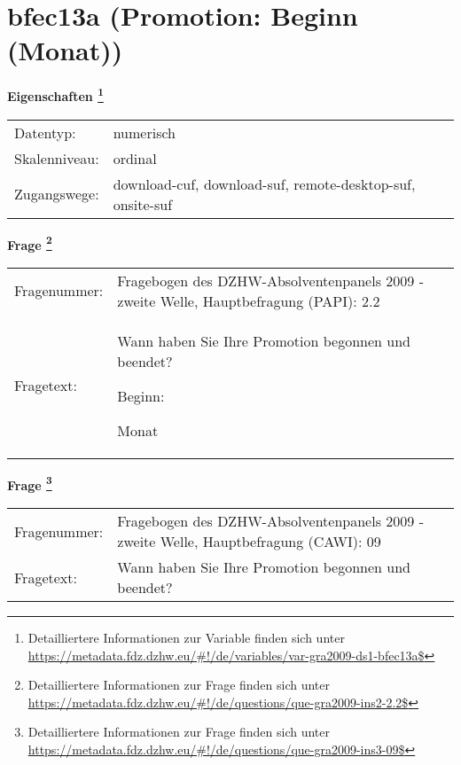 
    \setcounter{footnote}{0}

    \vspace*{-1.8cm}
	\section{bfec13a (Promotion: Beginn (Monat))}
	\label{section:bfec13a}



    \vspace*{0.5cm}
    \noindent\textbf{Eigenschaften
	\footnote{Detailliertere Informationen zur Variable finden sich unter
		\url{https://metadata.fdz.dzhw.eu/\#!/de/variables/var-gra2009-ds1-bfec13a$}}}\\
	\begin{tabularx}{\hsize}{@{}lX}
	Datentyp: & numerisch \\
	Skalenniveau: & ordinal \\
	Zugangswege: &
	  download-cuf, 
	  download-suf, 
	  remote-desktop-suf, 
	  onsite-suf
 \\
    \end{tabularx}



				\vspace*{0.5cm}
                \noindent\textbf{Frage
	                \footnote{Detailliertere Informationen zur Frage finden sich unter
		              \url{https://metadata.fdz.dzhw.eu/\#!/de/questions/que-gra2009-ins2-2.2$}}}\\
				\begin{tabularx}{\hsize}{@{}lX}
					Fragenummer: &
					  Fragebogen des DZHW-Absolventenpanels 2009 - zweite Welle, Hauptbefragung (PAPI):
					  2.2
 \\
					Fragetext: & Wann haben Sie Ihre Promotion begonnen und beendet?\par  Beginn:\par  Monat \\
				\end{tabularx}
				\vspace*{0.5cm}
                \noindent\textbf{Frage
	                \footnote{Detailliertere Informationen zur Frage finden sich unter
		              \url{https://metadata.fdz.dzhw.eu/\#!/de/questions/que-gra2009-ins3-09$}}}\\
				\begin{tabularx}{\hsize}{@{}lX}
					Fragenummer: &
					  Fragebogen des DZHW-Absolventenpanels 2009 - zweite Welle, Hauptbefragung (CAWI):
					  09
 \\
					Fragetext: & Wann haben Sie Ihre Promotion begonnen und beendet? \\
				\end{tabularx}





